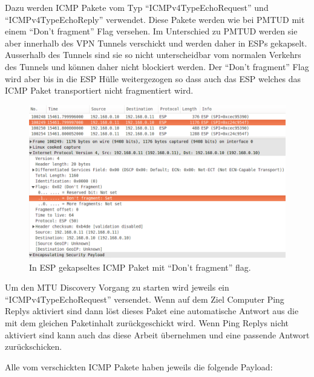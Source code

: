 Dazu werden \acs{ICMP} Pakete vom Typ \enquote{ICMPv4TypeEchoRequest} und \enquote{ICMPv4TypeEchoReply} verwendet. Diese Pakete werden wie bei \acs{PMTUD} mit einem \enquote{Don't fragment} Flag versehen. Im Unterschied zu \acs{PMTUD} werden sie aber innerhalb des \acs{VPN} Tunnels verschickt und werden daher in \acs{ESP}s gekapselt. Ausserhalb des Tunnels sind sie so nicht unterscheidbar vom normalen Verkehrs des Tunnels und können daher nicht blockiert werden. Der \enquote{Don't fragment} Flag wird aber bis in die \acs{ESP} Hülle weitergezogen so dass auch das \acs{ESP} welches das \acs{ICMP} Paket transportiert nicht fragmentiert wird.

\begin{figure}[ht]
    \begin{center}
        \includegraphics[trim=1 0 0 0,clip,width=\textwidth]{mainpart/implementation/img/ESP_DontFragment}
    \end{center}
    \caption{In ESP gekapseltes ICMP Paket mit \enquote{Don't fragment} flag.}
\end{figure}

Um den \acs{MTU} Discovery Vorgang zu starten wird jeweils ein \enquote{ICMPv4TypeEchoRequest} versendet. Wenn auf dem Ziel Computer Ping Replys aktiviert sind dann löst dieses Paket eine automatische Antwort aus die mit dem gleichen Paketinhalt zurückgeschickt wird. Wenn Ping Replys nicht aktiviert sind kann auch das \tool{} diese Arbeit übernehmen und eine passende Antwort zurückschicken.

Alle vom \tool{} verschickten \acs{ICMP} Pakete haben jeweils die folgende Payload:

